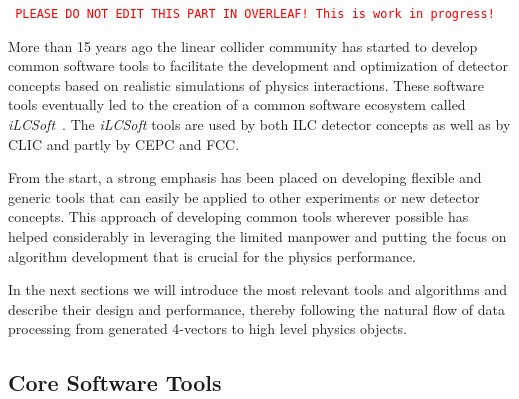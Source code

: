 %
%
\newcommand{\fix}[1]{\textcolor{red}{\texttt{#1}}} %

\newcommand{\CPP}{C\nolinebreak\hspace{-.05em}\raisebox{.4ex}{\tiny\bf +}\nolinebreak\hspace{-.10em}\raisebox{.4ex}{\tiny\bf +}}



\fix{ PLEASE DO NOT EDIT THIS PART IN OVERLEAF! This is work in progress!}




More than 15 years ago the linear collider community has started to develop common software
tools to facilitate the development and optimization of detector concepts based on realistic
simulations of physics interactions. These software tools eventually led to the creation of
a common software ecosystem called \emph{iLCSoft}~\cite{bib:ilcsoft}.
The \emph{iLCSoft} tools are used by both ILC detector concepts as well as by CLIC
and partly by CEPC and FCC.

From the start, a strong emphasis has been placed on developing flexible and generic tools
that can easily be applied to other experiments or new detector concepts. 
This approach of developing common tools wherever possible has helped considerably in
leveraging the limited manpower and putting the focus on algorithm development that
is crucial for the physics performance. 

In the next sections we will introduce the most relevant tools and algorithms and
describe their design and performance, thereby following the natural flow of data processing
from generated 4-vectors to high level physics objects.


\subsection{\label{sub:sw-core-tools}Core Software Tools}

